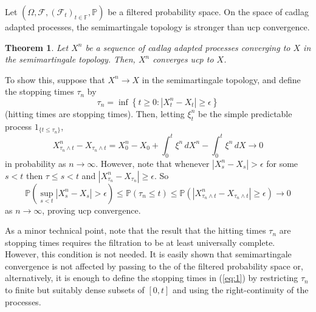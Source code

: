 \documentclass[12pt]{article}
\newtheorem*{theorem*}{Theorem}
\begin{document}

Let $(\Omega,\mathcal{F},(\mathcal{F}_t)_{t\in\mathbb{F}},\mathbb{P})$ be a filtered probability space. On the space of cadlag adapted processes, the semimartingale topology is stronger than ucp convergence.

\begin{theorem*}
Let $X^n$ be a sequence of cadlag adapted processes converging to $X$ in the semimartingale topology. Then, $X^n$ converges ucp to $X$.
\end{theorem*}

To show this, suppose that $X^n\rightarrow X$ in the semimartingale topology, and define the stopping times $\tau_n$ by
\begin{equation}\label{eq:1}
\tau_n =\inf\left\{t\ge 0:|X^n_t-X_t|\ge\epsilon\right\}
\end{equation}
(hitting times are stopping times).
Then, letting $\xi^n_t$ be the simple predictable process $1_{\{t\le\tau_n\}}$,
\begin{equation*}
X^n_{\tau_n\wedge t}-X_{\tau_n\wedge t}=X^n_0-X_0+\int_0^t\xi^n\,dX^n-\int_0^t\xi^n\,dX\rightarrow 0
\end{equation*}
in probability as $n\rightarrow\infty$. However, note that whenever $|X^n_s-X_s|>\epsilon$ for some $s<t$ then $\tau\le s<t$ and $|X^n_{\tau_n}-X_{\tau_n}|\ge\epsilon$. So
\begin{equation*}
\mathbb{P}\left(\sup_{s<t}|X^n_s-X_s|>\epsilon\right)\le\mathbb{P}(\tau_n\le t)
\le \mathbb{P}\left(|X^n_{\tau_n\wedge t}-X_{\tau_n\wedge t}|\ge\epsilon\right)\rightarrow 0
\end{equation*}
as $n\rightarrow\infty$, proving ucp convergence. 

As a minor technical point, note that the result that the hitting times $\tau_n$ are stopping times requires the filtration to be at least universally complete. However, this condition is not needed. It is easily shown that semimartingale convergence is not affected by passing to the  of the filtered probability space or, alternatively, it is enough to define the stopping times in (\ref{eq:1}) by restricting $\tau_n$ to finite but suitably dense subsets of $[0,t]$ and using the right-continuity of the processes.

\end{document}
